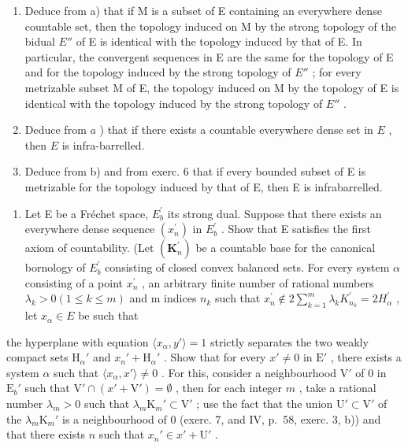 \begin{enumerate}
\def\labelenumi{\alph{enumi})}
\setcounter{enumi}{1}
\item
  Deduce from a) that if M is a subset of E containing an everywhere dense countable set, then the topology induced on M by the strong topology of the bidual \(E''\) of E is identical with the topology induced by that of E. In particular, the convergent sequences in E are the same for the topology of E and for the topology induced by the strong topology of \(E''\) ; for every metrizable subset M of E, the topology induced on M by the topology of E is identical with the topology induced by the strong topology of \(E''\) .
\item
  Deduce from \(a\) ) that if there exists a countable everywhere dense set in \(E\) , then \(E\) is infra-barrelled.
\item
  Deduce from b) and from exerc. 6 that if every bounded subset of E is metrizable for the topology induced by that of E, then E is infrabarrelled.
\end{enumerate}

\begin{enumerate}
\def\labelenumi{\arabic{enumi})}
\setcounter{enumi}{7}
\tightlist
\item
  Let E be a Fréchet space, \(E_{b}^{\prime}\) its strong dual. Suppose that there exists an everywhere dense sequence \((x_{n}^{\prime})\) in \(E_{b}^{\prime}\) . Show that E satisfies the first axiom of countability. (Let \((\mathbf{K}_{n}^{\prime})\) be a countable base for the canonical bornology of \(E_{b}^{\prime}\) consisting of closed convex balanced sets. For every system \(\alpha\) consisting of a point \(x_{n}^{\prime}\) , an arbitrary finite number of rational numbers \(\lambda_{k} > 0 (1 \leqslant k \leqslant m)\) and m indices \(n_{k}\) such that \(x_{n}^{\prime} \notin 2 \sum_{k=1}^{m} \lambda_{k} K_{n_{k}}^{\prime} = 2 H_{\alpha}^{\prime}\) , let \(x_{\alpha} \in E\) be such that
\end{enumerate}

the hyperplane with equation \(\langle x_{\alpha}, y' \rangle = 1\) strictly separates the two weakly compact sets \(\mathrm{H}_{\alpha}'\) and \(x_{n}' + \mathrm{H}_{\alpha}'\) . Show that for every \(x' \neq 0\) in \(\mathrm{E}'\) , there exists a system \(\alpha\) such that \(\langle x_{\alpha}, x' \rangle \neq 0\) . For this, consider a neighbourhood \(\mathrm{V}'\) of 0 in \(\mathrm{E}_b'\) such that \(\mathrm{V}' \cap (x' + \mathrm{V}') = \emptyset\) , then for each integer \(m\) , take a rational number \(\lambda_m > 0\) such that \(\lambda_m \mathrm{K}_m' \subset \mathrm{V}'\) ; use the fact that the union \(\mathrm{U}' \subset \mathrm{V}'\) of the \(\lambda_m \mathrm{K}_m'\) is a neighbourhood of 0 (exerc. 7, and IV, p.~58, exerc. 3, b)) and that there exists \(n\) such that \(x_n' \in x' + \mathrm{U}'\) .

